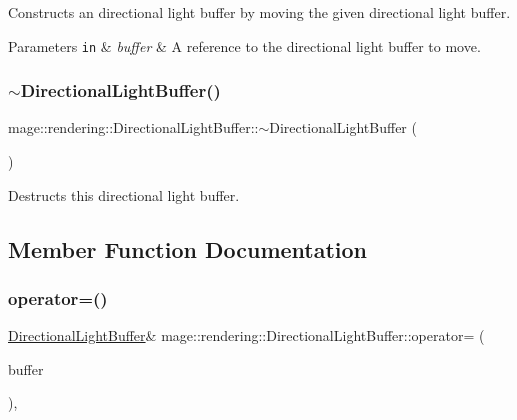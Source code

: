Constructs an directional light buffer by moving the given directional light buffer.


\begin{DoxyParams}[1]{Parameters}
\mbox{\tt in}  & {\em buffer} & A reference to the directional light buffer to move. \\
\hline
\end{DoxyParams}
\mbox{\label{structmage_1_1rendering_1_1_directional_light_buffer_ac52791a07948b17670c13b4aa0ddb104}} 
\subsubsection{\texorpdfstring{$\sim$\+Directional\+Light\+Buffer()}{~DirectionalLightBuffer()}}
{\footnotesize\ttfamily mage\+::rendering\+::\+Directional\+Light\+Buffer\+::$\sim$\+Directional\+Light\+Buffer (\begin{DoxyParamCaption}{ }\end{DoxyParamCaption})\hspace{0.3cm}{\ttfamily [default]}}

Destructs this directional light buffer. 

\subsection{Member Function Documentation}
\mbox{\label{structmage_1_1rendering_1_1_directional_light_buffer_ae2dfc882b678be7ae81b6d51b55f74bc}} 
\subsubsection{\texorpdfstring{operator=()}{operator=()}\hspace{0.1cm}{\footnotesize\ttfamily [1/2]}}
{\footnotesize\ttfamily \mbox{\hyperlink{structmage_1_1rendering_1_1_directional_light_buffer}{Directional\+Light\+Buffer}}\& mage\+::rendering\+::\+Directional\+Light\+Buffer\+::operator= (\begin{DoxyParamCaption}\item[{const \mbox{\hyperlink{structmage_1_1rendering_1_1_directional_light_buffer}{Directional\+Light\+Buffer}} \&}]{buffer }\end{DoxyParamCaption})\hspace{0.3cm}{\ttfamily [default]}, {\ttfamily [noexcept]}}


